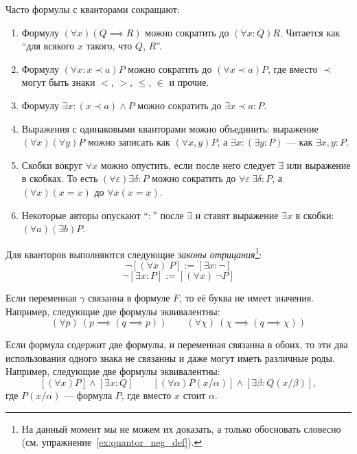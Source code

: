 Часто формулы с кванторами сокращают:
\begin{enumerate}
	\item{}Формулу ${(\forall x)(Q\implies R)}$ можно сократить
	до ${(\forall x:Q)R}$. Читается как ``для всякого $x$ такого, что
	$Q$, $R$''.

	\item{}Формулу $(\forall x:x\prec a)P$ можно сократить до $(\forall x\prec a)P$,
	где вместо $\prec$ могут быть знаки $<$, $>$, $\leq$, $\in$ и прочие.

	\item{}Формулу $\exists x:(x\prec a)\land P$ можно сократить
	до $\exists x\prec a:P$.

	\item{}Выражения с одинаковыми кванторами можно объединить:
	выражение $(\forall x)(\forall y)P$ можно записать как $(\forall x,y)P$,
	а ${\exists x:(\exists y:P)}$ --- как $\exists x,y:P$.

	\item{}Скобки вокруг $\forall x$ можно опустить, если после него следует $\exists$ или
	выражение в скобках.
	То есть ${(\forall \varepsilon)\exists \delta:P}$
	можно сократить до $\forall \varepsilon~\exists \delta:P$,
	а $(\forall x)(x=x)$ до $\forall x(x=x)$.

	\item{}Некоторые авторы опускают ``$:$'' после $\exists$ и
	ставят выражение $\exists x$ в скобки: $(\forall a)(\exists b)P$.
\end{enumerate}

Для кванторов выполняются следующие {\it законы отрицания}\footnote{
	На данный момент мы не можем их доказать, а только
	обосновать словесно (см. упражнение~\ref{ex:quantor_neg_def}).
}:
\[
	\lnot[(\forall x)~P]:=[\exists x:\lnot]
\]
\[
	\lnot[\exists x:P]:=[(\forall x)~\lnot P]
\]

Если переменная $\gamma$ связанна в формуле $F$, то её буква не имеет значения.
Например, следующие две формулы эквивалентны:
\[
	(\forall p)~(p\implies (q\implies p))\qquad
	(\forall \chi)~(\chi\implies (q\implies\chi))
\]

Если формула содержит две формулы, и переменная
связанна в обоих, то эти два использования
одного знака не связанны и даже могут иметь различные роды.
Например, следующие две формулы эквивалентны:
\[
	[(\forall x)P]\land[\exists x:Q]\qquad
	[(\forall \alpha)P(x/\alpha)]\land[\exists \beta:Q(x/\beta)],
\]
где $P(x/\alpha)$ --- формула $P$, где вместо $x$ стоит $\alpha$.

